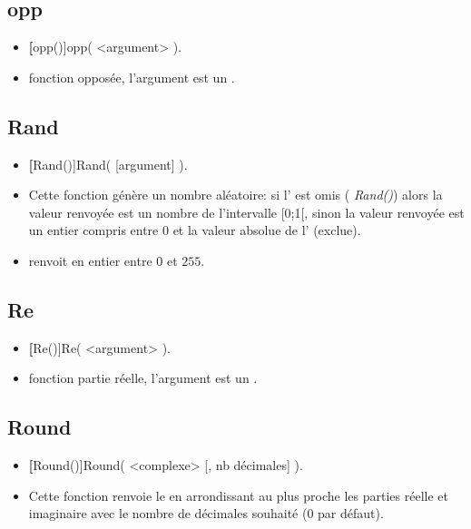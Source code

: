 \subsection{opp}

\begin{itemize}
 \item \util \textbf[opp()]{opp( <argument> )}.
 \item \desc fonction opposée, l'argument est un .
\end{itemize}

\subsection{Rand}

\begin{itemize}
 \item \util \textbf[Rand()]{Rand( [argument] )}.
 \item \desc Cette fonction génère un nombre aléatoire: si l' est omis (\textsl{ Rand()}) alors la valeur renvoyée est un nombre de l'intervalle [0;1[, sinon la valeur renvoyée est un entier compris entre 0 et la valeur absolue de l' (exclue).
 \item \exem {} renvoit en entier entre $0$ et $255$.
\end{itemize}

\subsection{Re}

\begin{itemize}
 \item \util \textbf[Re()]{Re( <argument> )}.
 \item \desc fonction partie réelle, l'argument est un .
\end{itemize}

\subsection{Round}\label{cmdRound}

\begin{itemize}
 \item \util \textbf[Round()]{Round( <complexe> [, nb décimales] )}.
 \item \desc Cette fonction renvoie le  en arrondissant au plus proche les parties réelle et imaginaire avec le nombre de décimales souhaité (0 par défaut).
\end{itemize}

